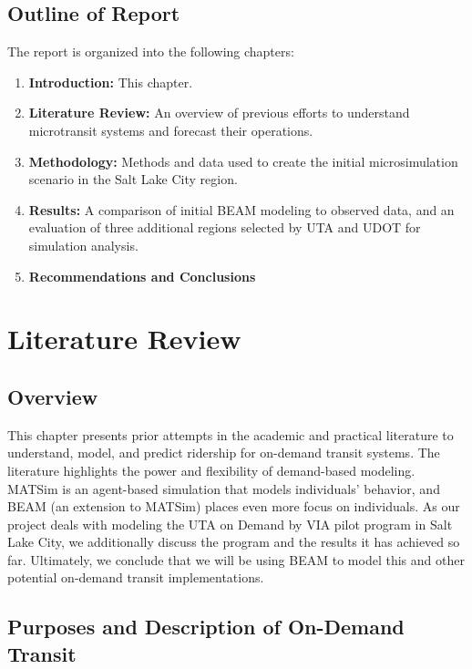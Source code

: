 \documentclass[
]{article}
\providecommand{\tightlist}{%
  \setlength{\itemsep}{0pt}\setlength{\parskip}{0pt}}
\begin{document}
\hypertarget{outline-of-report}{%
\subsection{Outline of Report}\label{outline-of-report}}

The report is organized into the following chapters:

\begin{enumerate}
\def\labelenumi{\arabic{enumi}.}
\tightlist
\item
  \textbf{Introduction:} This chapter.
\item
  \textbf{Literature Review:} An overview of previous efforts to understand microtransit systems and forecast their operations.
\item
  \textbf{Methodology:} Methods and data used to create the initial microsimulation scenario in the Salt Lake City region.
\item
  \textbf{Results:} A comparison of initial BEAM modeling to observed data, and an evaluation of three additional regions selected by UTA and UDOT for simulation analysis.
\item
  \textbf{Recommendations and Conclusions}
\end{enumerate}

\hypertarget{literature-review}{%
\section{Literature Review}\label{literature-review}}

\hypertarget{overview}{%
\subsection{Overview}\label{overview}}

This chapter presents prior attempts in the academic and practical literature to understand, model, and predict ridership for on-demand transit systems. The literature highlights the power and flexibility of demand-based modeling. MATSim is an agent-based simulation that models individuals' behavior, and BEAM (an extension to MATSim) places even more focus on individuals. As our project deals with modeling the UTA on Demand by VIA pilot program in Salt Lake City, we additionally discuss the program and the results it has achieved so far. Ultimately, we conclude that we will be using BEAM to model this and other potential on-demand transit implementations.

\hypertarget{purposes-and-description-of-on-demand-transit}{%
\subsection{Purposes and Description of On-Demand Transit}\label{purposes-and-description-of-on-demand-transit}}
\end{document}
